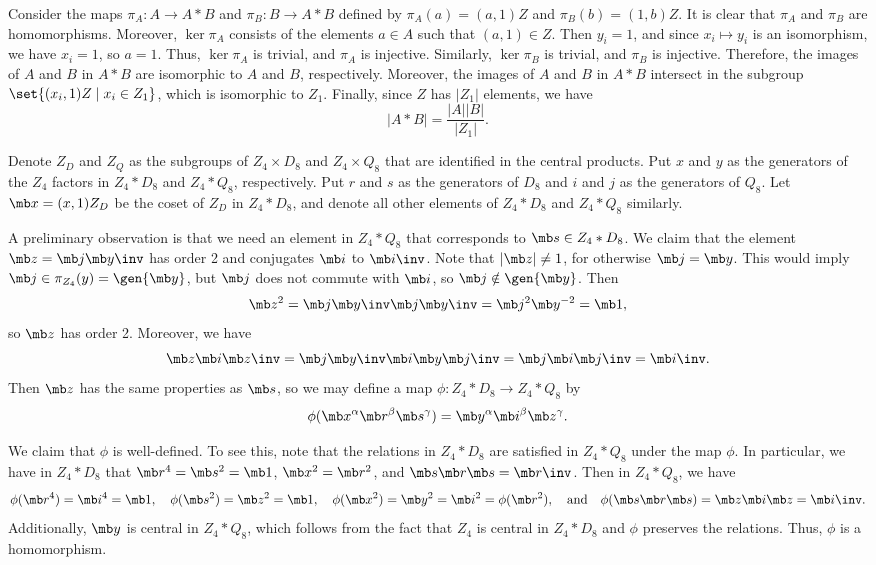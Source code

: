 \begin{solenum}[spsol]
    \item Consider the maps $\pi_A : A \to A \ast B$ and $\pi_B : B \to A \ast B$ defined by $\pi_A(a) = (a, 1)Z$ and $\pi_B(b) = (1, b)Z$.
	It is clear that $\pi_A$ and $\pi_B$ are homomorphisms.
	Moreover, $\ker\pi_A$ consists of the elements $a \in A$ such that $(a, 1) \in Z$.
	Then $y_i = 1$, and since $x_i \mapsto y_i$ is an isomorphism, we have $x_i = 1$, so $a = 1$.
	Thus, $\ker\pi_A$ is trivial, and $\pi_A$ is injective.
	Similarly, $\ker\pi_B$ is trivial, and $\pi_B$ is injective.
	Therefore, the images of $A$ and $B$ in $A \ast B$ are isomorphic to $A$ and $B$, respectively.
	Moreover, the images of $A$ and $B$ in $A \ast B$ intersect in the subgroup $\set{(x_i, 1)Z \mid x_i \in Z_1}$, which is isomorphic to $Z_1$.
	Finally, since $Z$ has $|Z_1|$ elements, we have
    \[
    	|A \ast B| = \frac{|A||B|}{|Z_1|}.
    \]
    \item Denote $Z_D$ and $Z_Q$ as the subgroups of $Z_4 \times D_8$ and $Z_4 \times Q_8$ that are identified in the central products.
    Put $x$ and $y$ as the generators of the $Z_4$ factors in $Z_4 \ast D_8$ and $Z_4 \ast Q_8$, respectively.
    Put $r$ and $s$ as the generators of $D_8$ and $i$ and $j$ as the generators of $Q_8$.
    Let $\mb x = (x, 1)Z_D$ be the coset of $Z_D$ in $Z_4 \ast D_8$, and denote all other elements of $Z_4 \ast D_8$ and $Z_4 \ast Q_8$ similarly.

    A preliminary observation is that we need an element in $Z_4 \ast Q_8$ that corresponds to $\mb s \in Z_4 \ast D_8$.
    We claim that the element $\mb z = \mb j \mb y\inv$ has order 2 and conjugates $\mb i$ to $\mb i\inv$.
    Note that $|\mb z| \neq 1$, for otherwise $\mb j = \mb y$. This would imply $\mb j \in \pi_{Z_4}(y) = \gen{\mb y}$, but $\mb j$ does not commute with $\mb i$, so $\mb j \notin \gen{\mb y}$. Then
    \[
        \mb z^2 = \mb j \mb y\inv \mb j \mb y\inv = \mb j^2 \mb y^{-2} = \mb 1,
    \]
    so $\mb z$ has order 2.
    Moreover, we have
    \[
        \mb z \mb i \mb z\inv = \mb j \mb y\inv \mb i \mb y \mb j\inv = \mb j \mb i \mb j\inv = \mb i\inv.
    \]
    Then $\mb z$ has the same properties as $\mb s$, so we may define a map $\phi : Z_4 \ast D_8 \to Z_4 \ast Q_8$ by
    \[
        \phi(\mb x^\alpha \mb r^\beta \mb s^\gamma) = \mb y^\alpha \mb i^\beta \mb z^\gamma.
    \]

    We claim that $\phi$ is well-defined.
    To see this, note that the relations in $Z_4 \ast D_8$ are satisfied in $Z_4 \ast Q_8$ under the map $\phi$.
    In particular, we have in $Z_4 \ast D_8$ that $\mb r^4 = \mb s^2 = \mb 1$, $\mb x^2 = \mb r^2$, and $\mb s\mb r\mb s = \mb r\inv$.
    Then in $Z_4 \ast Q_8$, we have
    \[
        \phi(\mb r^4) = \mb i^4 = \mb 1, \quad \phi(\mb s^2) = \mb z^2 = \mb 1, \quad \phi(\mb x^2) = \mb y^2 = \mb i^2 = \phi(\mb r^2), \quad \text{and} \quad \phi(\mb s\mb r\mb s) = \mb z\mb i\mb z = \mb i\inv.
    \]
    Additionally, $\mb y$ is central in $Z_4 \ast Q_8$, which follows from the fact that $Z_4$ is central in $Z_4 \ast D_8$ and $\phi$ preserves the relations.
    Thus, $\phi$ is a homomorphism.


\end{solenum}
